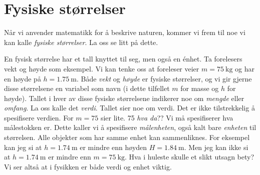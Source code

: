 \section{Fysiske størrelser}
Når vi anvender matematikk for å beskrive naturen, kommer vi frem til noe vi kan kalle \textit{fysiske størrelser}. La oss se litt på dette.

En fysisk størrelse har et tall knyttet til seg, men også en énhet. Ta forelesers vekt og høyde som eksempel. Vi kan tenke oss at foreleser veier $m=\SI{75}{\kilo\gram}$ og har en høyde på $h=\SI{1.75}{\metre}$. Både \textit{vekt} og \textit{høyde} er fysiske størrelser, og vi gir gjerne disse størrelsene en variabel som navn (i dette tilfellet $m$ for masse og $h$ for høyde). Tallet i hver av disse fysiske størrelsene indikerer noe om \textit{mengde} eller \textit{omfang}. La oss kalle det \textit{verdi}.  Tallet sier noe om verdi.
Det er ikke tilstrekkelig å spesifisere verdien. For $m=75$ sier lite. 75 \textit{hva da}?? Vi må spesifiserer hva målestokken er. Dette kaller vi å spesifisere \textit{målenheten}, også kalt bare \textit{enheten} til størrelsen. Alle objekter som har samme enhet kan sammenliknes. For eksempel kan jeg si at $h=\SI{1.74}{\metre}$ er mindre enn høyden $H=\SI{1.84}{\metre}$. Men jeg kan ikke si at $h=\SI{1.74}{\metre}$ er mindre enn $m=\SI{75}{\kilo\gram}$. Hva i huleste skulle et slikt utsagn bety? Vi ser altså at i fysikken er både verdi og enhet viktig.



